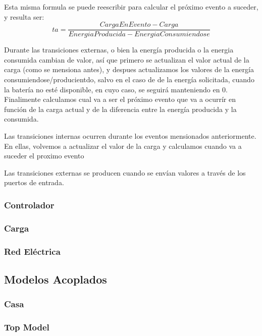 Esta misma formula se puede reescribir para calcular el próximo evento a suceder,
y resulta ser:
$$ta = \frac{CargaEnEvento - Carga}{EnergiaProducida - EnergiaConsumiendose}$$



Durante las transiciones externas, o bien la energía producida o la energia consumida
cambian de valor, así que primero se actualizan el valor actual de la carga (como se mensiona antes),
y despues actualizamos los valores de la energía consumiendose/producientdo, salvo en el caso de 
de la energía solicitada, cuando la batería no esté disponible, en cuyo caso, se seguirá manteniendo en 0.
Finalimente calculamos cual va a ser el próximo evento que va a ocurrír en función de la
carga actual y de la diferencia entre la energía producida y la consumida.

Las transiciones internas ocurren durante los eventos mensionados anteriormente. En ellas,
volvemos a actualizar el valor de la carga y calculamos cuando va a suceder el proximo evento 




Las transiciones externas se producen cuando se envían valores a través de los puertos
de entrada. 


\subsubsection{Controlador}
\subsubsection{Carga}
\subsubsection{Red Eléctrica}

\subsection{Modelos Acoplados}

\subsubsection{Casa}
\subsubsection{Top Model}